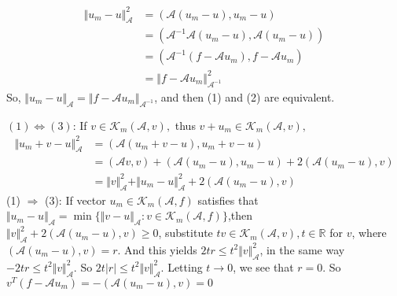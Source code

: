 \documentclass{article}
\begin{document}
\begin{equation*}
    \begin{aligned}
        \Vert u_m-u\Vert_\mathcal{A}^2 & =(\mathcal{A}(u_m-u),u_m-u)                              \\
                                       & =(\mathcal{A}^{-1}\mathcal{A}(u_m-u),\mathcal{A}(u_m-u)) \\
                                       & =(\mathcal{A}^{-1}(f-\mathcal{A}u_m),f-\mathcal{A}u_m)   \\
                                       & =\Vert f-\mathcal{A}u_m\Vert_{\mathcal{A}^{-1}}^2
    \end{aligned}
\end{equation*}
So, $\Vert u_m-u\Vert_\mathcal{A}=\Vert f-\mathcal{A}u_m\Vert_{\mathcal{A}^{-1}}$, and then (1) and (2) are equivalent.

$(1)\Leftrightarrow (3)$:
If $v\in \mathcal{K}_m(\mathcal{A},v),$ thus  $v+u_m\in \mathcal{K}_m(\mathcal{A},v),$
\begin{equation*}
    \begin{aligned}
        \Vert u_m+v-u\Vert_\mathcal{A}^2 & =(\mathcal{A}(u_m+v-u),u_m+v-u)                                                     \\
                                         & =(\mathcal{A}v,v)+(\mathcal{A}(u_m-u),u_m-u) +2 (\mathcal{A}(u_m-u),v)              \\
                                         & =\Vert v\Vert_\mathcal{A}^2+\Vert u_m-u\Vert_\mathcal{A}^2+2 (\mathcal{A}(u_m-u),v)
    \end{aligned}
\end{equation*}
(1) $\Rightarrow$ (3):
If  vector $u_m\in\mathcal{K}_m(\mathcal{A},f)$  satisfies that $\Vert u_m-u\Vert_\mathcal{A}=\min\{\Vert v-u\Vert_\mathcal{A}:v\in \mathcal{K}_m(\mathcal{A},f)\}$,then
$\Vert v \Vert_\mathcal{A}^2+2 (\mathcal{A}(u_m-u),v)\geqslant 0$,
substitute $tv\in\mathcal{K}_m(\mathcal{A},v), t\in\mathbb{R}$ for $v$, where $(\mathcal{A}(u_m-u),v)=r$. And this yields $2tr\leqslant t^2\Vert v\Vert_\mathcal{A}^2$, in the same way $-2tr\leqslant t^2\Vert v\Vert_\mathcal{A}^2$.
So $2t\vert r\vert \leqslant t^2\Vert v\Vert_\mathcal{A}^2$. Letting $t\to 0$, we see that $r=0$. So $v^T(f-\mathcal{A}u_m)=-(\mathcal{A}(u_m-u),v)=0$
\end{document}
